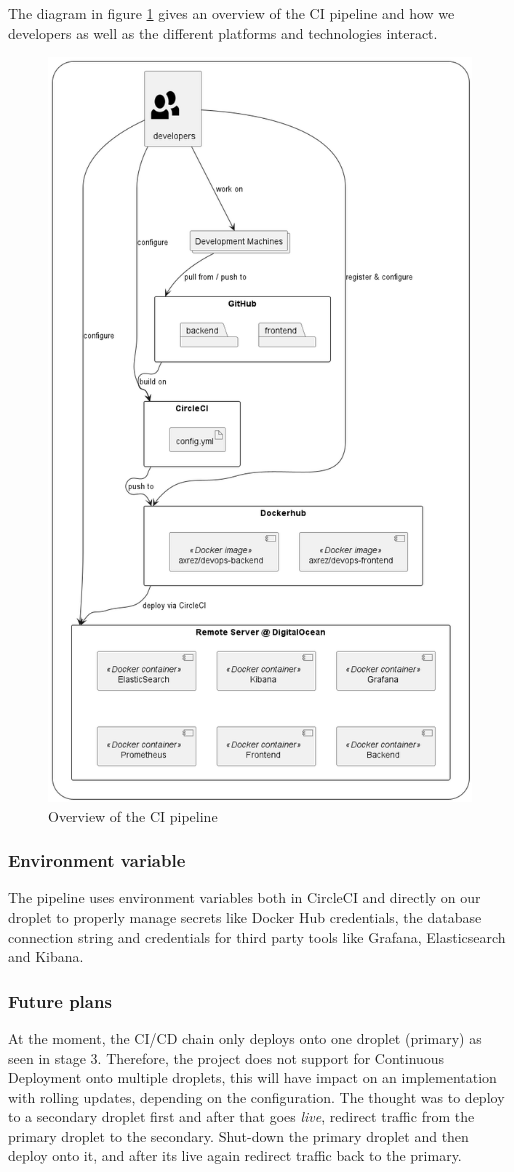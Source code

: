 The diagram in figure \ref{fig:CI} gives an overview of the CI pipeline and how we developers as well as the different platforms and technologies interact.
\begin{figure}[H]
 \centering
 \includegraphics[width = .7 \textwidth]{images/ci.png}
 \caption{Overview of the CI pipeline}
 \label{fig:CI}
\end{figure}

\subsubsection{Environment variable}
The pipeline uses environment variables both in CircleCI and directly on our droplet to properly manage secrets like Docker Hub credentials, the database connection string and credentials for third party tools like Grafana, Elasticsearch and Kibana.

\subsubsection{Future plans}
At the moment, the CI/CD chain only deploys onto one droplet (primary) as seen in stage 3. Therefore, the project does not support for Continuous Deployment onto multiple droplets, this will have impact on an implementation with rolling updates, depending on the configuration. The thought was to deploy to a secondary droplet first and after that goes \textit{live}, redirect traffic from the primary droplet to the secondary. Shut-down the primary droplet and then deploy onto it, and after its live again redirect traffic back to the primary.

